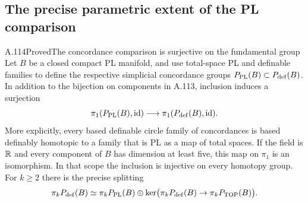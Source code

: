 \subsection{The precise parametric extent of the PL comparison}

\begin{saresult}{A.114}{Proved}{The concordance comparison is surjective on the fundamental group}
Let $B$ be a closed compact PL manifold, and use total-space PL and
definable families to define the respective simplicial concordance
groups $P_{\rm PL}(B)\subset P_{\rm def}(B)$. In addition to the
bijection on components in A.113, inclusion induces a surjection
\[
 \pi_1(P_{\rm PL}(B),\operatorname{id})
 \longrightarrow
 \pi_1(P_{\rm def}(B),\operatorname{id}).
\]
More explicitly, every based definable circle family of concordances
is based definably homotopic to a family that is PL as a map of
total spaces.
If the field is $\mathbb R$ and every component of $B$ has dimension at
least five, this map on $\pi_1$ is an isomorphism. In that scope
the inclusion is injective on every homotopy group.
For $k\ge2$ there is the precise splitting
\[
 \pi_kP_{\rm def}(B)\simeq
 \pi_kP_{\rm PL}(B)\oplus
 \ker\bigl(\pi_kP_{\rm def}(B)\to\pi_kP_{\rm TOP}(B)\bigr).
\]
\end{saresult}
